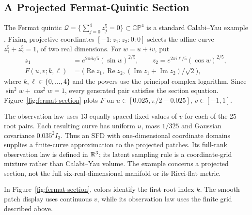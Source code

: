 \subsection{A Projected Fermat-Quintic Section}
\label{app:fermat-construction}
The Fermat quintic
$\mathcal Q=\{\sum_{j=0}^4z_j^5=0\}\subset\mathbb{CP}^4$
is a standard Calabi--Yau example \citep{hendi2024invariant}.
Fixing projective coordinates $[-1:z_1:z_2:0:0]$ selects the affine curve
$z_1^5+z_2^5=1$, of two real dimensions. For $w=u+iv$, put
\begin{equation}
 \begin{split}
 z_1&=e^{2\pi i k/5}(\sin w)^{2/5},\qquad
 z_2=e^{2\pi i \ell/5}(\cos w)^{2/5},\\
 F(u,v;k,\ell)&=\bigl(\operatorname{Re}z_1,\operatorname{Re}z_2,
              (\operatorname{Im}z_1+\operatorname{Im}z_2)/\sqrt2\bigr),
 \end{split}
 \label{eq:fermat-projection}
\end{equation}
where $k,\ell\in\{0,\ldots,4\}$ and the powers use the principal complex
logarithm. Since $\sin^2w+\cos^2w=1$, every generated pair satisfies the
section equation. Figure~\ref{fig:fermat-section} plots $F$ on
$u\in[0.025,\pi/2-0.025]$, $v\in[-1,1]$.

The observation law uses 13 equally spaced fixed values of $v$ for each of
the 25 root pairs. Each resulting curve has uniform $u$, mass $1/325$ and
Gaussian covariance $0.035^2I_3$. Thus an SFD with one-dimensional coordinate
domains supplies a finite-curve approximation to the projected patches.
Its full-rank observation law is defined in $\mathbb R^3$; its latent sampling rule
is a coordinate-grid mixture rather than Calabi--Yau volume. The example
concerns a projected section, not the full six-real-dimensional manifold or
its Ricci-flat metric.

In Figure~\ref{fig:fermat-section}, colors identify the first root index
$k$. The smooth patch display uses continuous $v$, while its observation
law uses the finite grid described above.

